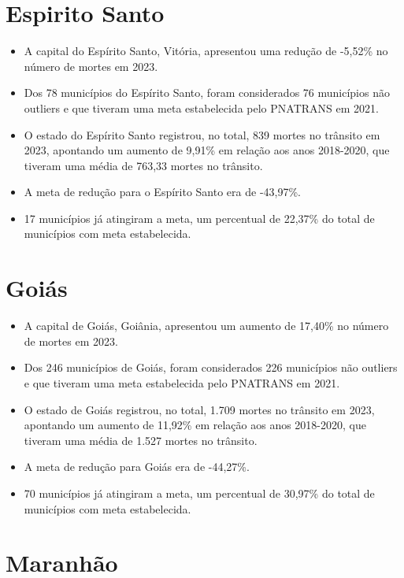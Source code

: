 \documentclass[
  letterpaper,
  DIV=11,
  numbers=noendperiod]{scrreprt}
\begin{document}
\section{Espirito Santo}\label{espirito-santo}

\begin{itemize}
\item
  A capital do Espírito Santo, Vitória, apresentou uma redução de
  -5,52\% no número de mortes em 2023.
\item
  Dos 78 municípios do Espírito Santo, foram considerados 76 municípios
  não outliers e que tiveram uma meta estabelecida pelo PNATRANS em
  2021.
\item
  O estado do Espírito Santo registrou, no total, 839 mortes no trânsito
  em 2023, apontando um aumento de 9,91\% em relação aos anos 2018-2020,
  que tiveram uma média de 763,33 mortes no trânsito.
\item
  A meta de redução para o Espírito Santo era de -43,97\%.
\item
  17 municípios já atingiram a meta, um percentual de 22,37\% do total
  de municípios com meta estabelecida.
\end{itemize}

\section{Goiás}\label{goiuxe1s}

\begin{itemize}
\item
  A capital de Goiás, Goiânia, apresentou um aumento de 17,40\% no
  número de mortes em 2023.
\item
  Dos 246 municípios de Goiás, foram considerados 226 municípios não
  outliers e que tiveram uma meta estabelecida pelo PNATRANS em 2021.
\item
  O estado de Goiás registrou, no total, 1.709 mortes no trânsito em
  2023, apontando um aumento de 11,92\% em relação aos anos 2018-2020,
  que tiveram uma média de 1.527 mortes no trânsito.
\item
  A meta de redução para Goiás era de -44,27\%.
\item
  70 municípios já atingiram a meta, um percentual de 30,97\% do total
  de municípios com meta estabelecida.
\end{itemize}

\section{Maranhão}\label{maranhuxe3o}
\end{document}
